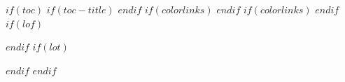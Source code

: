 $if(toc)$
$if(toc-title)$
\renewcommand*\contentsname{$toc-title$}
$endif$
$if(colorlinks)$
\hypersetup{linkcolor=$if(toccolor)$$toccolor$$else$black$endif$}
$endif$
\setcounter{tocdepth}{$toc-depth$}
\tableofcontents
$if(colorlinks)$
\hypersetup{linkcolor=}
$endif$
$if(lof)$
\listoffigures
$endif$
$if(lot)$
\listoftables
$endif$
$endif$
